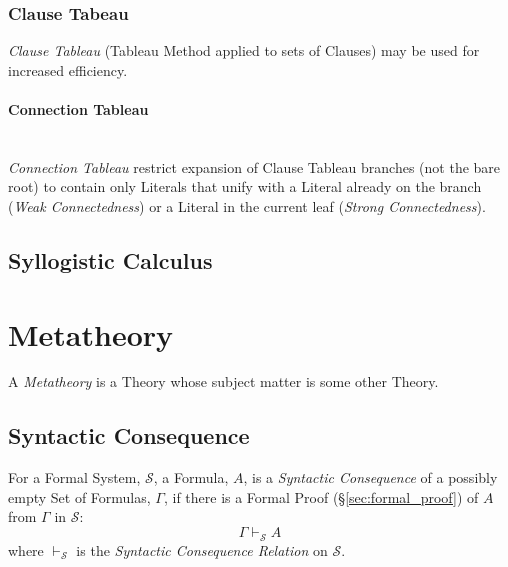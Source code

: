 \subsubsection{Clause Tabeau} \label{sec:clause_tableau}

\emph{Clause Tableau} (Tableau Method applied to sets of Clauses) may
be used for increased efficiency.



\paragraph{Connection Tableau} \label{sec:connection_tableau}
\hfill \\

\emph{Connection Tableau} restrict expansion of Clause Tableau
branches (not the bare root) to contain only Literals that unify with
a Literal already on the branch (\emph{Weak Connectedness}) or a
Literal in the current leaf (\emph{Strong Connectedness}).



\subsection{Syllogistic Calculus} \label{sec:syllogistic_calculus}



\section{Metatheory} \label{sec:metatheory}

A \emph{Metatheory} is a Theory whose subject matter is some other
Theory.



\subsection{Syntactic Consequence}\label{sec:syntactic_consequence}

For a Formal System, $\mathcal{S}$, a Formula, $A$, is a \emph{Syntactic
  Consequence} of a possibly empty Set of Formulas, $\Gamma$, if there
is a Formal Proof (\S\ref{sec:formal_proof}) of $A$ from $\Gamma$ in
$\mathcal{S}$:
\[
    \Gamma \vdash_{\mathcal{S}} A
\]
where $\vdash_{\mathcal{S}}$ is the \emph{Syntactic Consequence
  Relation} on $\mathcal{S}$.



